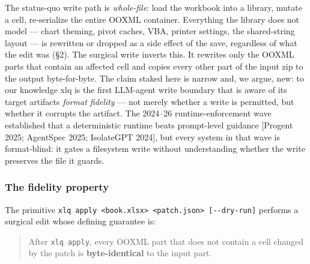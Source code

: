 \documentclass[
]{article}
\begin{document}
The status-quo write path is \emph{whole-file}: load the workbook into a
library, mutate a cell, re-serialize the entire OOXML container.
Everything the library does not model --- chart theming, pivot caches,
VBA, printer settings, the shared-string layout --- is rewritten or
dropped as a side effect of the save, regardless of what the edit was
(§2). The surgical write inverts this. It rewrites only the OOXML parts
that contain an affected cell and copies every other part of the input
zip to the output byte-for-byte. The claim staked here is narrow and, we
argue, new: to our knowledge xlq is the first LLM-agent write boundary
that is aware of its target artifact\textquotesingle s \emph{format
fidelity} --- not merely whether a write is permitted, but whether it
corrupts the artifact. The 2024--26 runtime-enforcement wave established
that a deterministic runtime beats prompt-level guidance {[}Progent
2025; AgentSpec 2025; IsolateGPT 2024{]}, but every system in that wave
is format-blind: it gates a filesystem write without understanding
whether the write preserves the file it guards.

\subsubsection{The fidelity property}\label{the-fidelity-property}

The primitive
\texttt{xlq\ apply\ \textless{}book.xlsx\textgreater{}\ \textless{}patch.json\textgreater{}\ {[}-\/-dry-run{]}}
performs a surgical edit whose defining guarantee is:

\begin{quote}
After \texttt{xlq\ apply}, every OOXML part that does not contain a cell
changed by the patch is \textbf{byte-identical} to the input part.
\end{quote}
\end{document}
